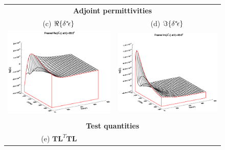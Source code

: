 \begin{figure}[htp]
\begin{tabular}{c c}
    \multicolumn{2}{c}{\sffamily\textbf{Adjoint permittivities}}\\
    \textsf{(c)} $\Re\{\delta^{*}\! \epsilon\}$ &
    \textsf{(d)} $\Im\{\delta^{*}\! \epsilon\}$ \\
    \includegraphics[bb=115 240 508 540,clip,scale=0.5]{graphics/Fresnel/TLAD/Re_e_AD_z20.0.eps} &
    \includegraphics[bb=110 240 508 540,clip,scale=0.5]{graphics/Fresnel/TLAD/Im_e_AD_z20.0.eps} \\\\
    \multicolumn{2}{c}{\sffamily\textbf{Test quantities}}\\
    \textsf{(e)} $\mathbf{TL}^{T}\mathbf{TL}$ &

\end{tabular}
\end{figure}
